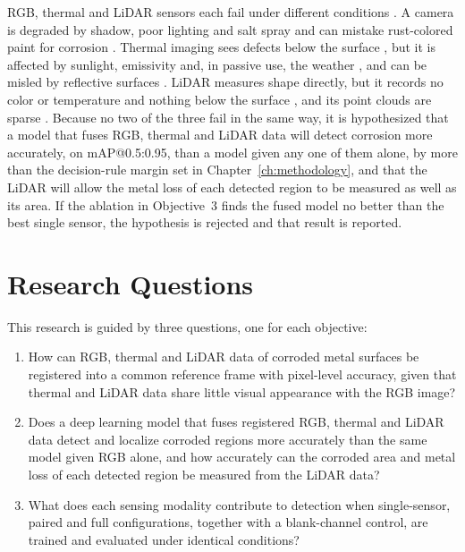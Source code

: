 RGB, thermal and LiDAR sensors each fail under different conditions
\citep{Tran2024}. A camera is degraded by shadow, poor lighting and salt spray
\citep{Soares2023,Mao2026,Espinoza2026} and can mistake rust-colored paint
for corrosion \citep{Espinoza2026,Lavadiya2022}. Thermal imaging sees defects
below the surface
\citep{Elizalde2023,Doshvarpassand2022,Hernndez-Surez2026}, but it is affected
by sunlight, emissivity and, in passive use, the weather
\citep{Elizalde2023,Egodawela2025}, and can be misled by reflective surfaces
\citep{Tran2024}. LiDAR measures shape directly, but it records no color or
temperature and nothing below the surface \citep{Ding2025}, and its point
clouds are sparse \citep{Tran2024}. Because no two of the three fail in the
same way, it is hypothesized that a model that fuses RGB, thermal and LiDAR
data will detect corrosion more accurately, on mAP@0.5:0.95, than a model given
any one of them alone, by more than the decision-rule margin set in
Chapter~\ref{ch:methodology}, and that the LiDAR will allow the metal loss of each detected region to
be measured as well as its area. If the ablation in Objective~3 finds the
fused model no better than the best single sensor, the hypothesis is rejected
and that result is reported.

\section{Research Questions}
\label{sec:research-questions}

This research is guided by three questions, one for each objective:

\begin{enumerate}[label=RQ\arabic*.,leftmargin=*,itemsep=8pt]
  \item How can RGB, thermal and LiDAR data of corroded metal surfaces be
        registered into a common reference frame with pixel-level accuracy,
        given that thermal and LiDAR data share little visual appearance with
        the RGB image?
  \item Does a deep learning model that fuses registered RGB, thermal and
        LiDAR data detect and localize corroded regions more accurately than
        the same model given RGB alone, and how accurately can the corroded
        area and metal loss of each detected region be measured from the LiDAR
        data?
  \item What does each sensing modality contribute to detection when
        single-sensor, paired and full configurations, together with a
        blank-channel control, are trained and evaluated under identical
        conditions?
\end{enumerate}

